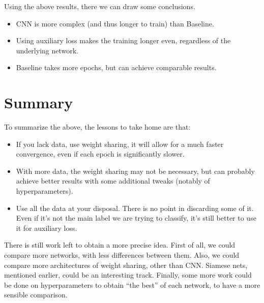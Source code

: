 \documentclass[10pt,conference]{IEEEtran}
\begin{document}
Using the above results, there we can draw some conclusions.
\begin{itemize}
    \item CNN is more complex (and thus longer to train) than Baseline.
    \item Using auxiliary loss makes the training longer even, regardless of the underlying network.
    \item Baseline takes more epochs, but can achieve comparable results.
\end{itemize}
\section{Summary}
To summarize the above, the lessons to take home are that:
\begin{itemize}
    \item If you lack data, use weight sharing, it will allow for a much faster convergence, even if each epoch is significantly slower.
    \item With more data, the weight sharing may not be necessary, but can probably achieve better results with some additional tweaks (notably of hyperparameters).
    \item Use all the data at your disposal. There is no point in discarding some of it. Even if it's not the main label we are trying to classify, it's still better to use it for auxiliary loss.
\end{itemize}
There is still work left to obtain a more precise idea. First of all, we could compare more networks, with less differences between them. Also, we could compare more architectures of weight sharing, other than CNN. Siamese nets, mentioned earlier, could be an interesting track. Finally, some more work could be done on hyperparameters to obtain ``the best'' of each network, to have a more sensible comparison.




\end{document}
